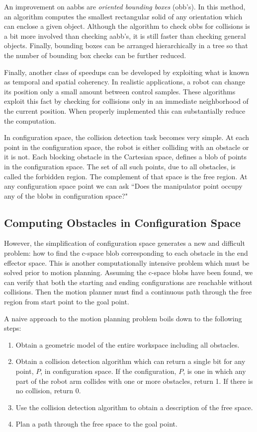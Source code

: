 An improvement on aabbs are \textit{oriented bounding boxes} (obb's).   In this method, an algorithm computes the smallest rectangular solid of any orientation which can enclose a given object.  Although the algorithm to check obbs for collisions is a bit more involved than checking aabb's, it is still   faster than checking general objects.   Finally, bounding boxes can be arranged hierarchically in a tree so that the number of bounding box checks can be further reduced.

Finally, another class of speedups can be developed by exploiting what is known as temporal and spatial coherency.   In realistic applications, a robot can change its position only a small amount between control samples.   These algorithms exploit this fact by checking for collisions only in an immediate neighborhood of the current position.  When properly implemented this can substantially reduce the computation.

In configuration space, the collision detection task becomes very simple. At each point in the configuration space, the robot is either colliding with an obstacle or it is not.   Each blocking obstacle in the Cartesian space, defines a blob of points in the configuration space.  The set of all such points, due to all obstacles, is called the forbidden region.  The complement of that space is the free region.  At any configuration space  point we can ask ``Does the manipulator point occupy any of the blobs in configuration space?"

\subsection{Computing Obstacles in Configuration Space}

However, the simplification of configuration space generates a new and difficult problem: how to find the c-space blob corresponding to each obstacle in the end effector space.  This is another computationally intensive problem which must be solved prior to motion planning.   Assuming the c-space blobs have been found, we can verify that both the starting and ending configurations are reachable without collisions.   Then the motion planner must find a continuous path through the free region from start point to the goal point.

A naive approach to  the motion planning problem boils down to the following steps:
\begin{enumerate}
 \item Obtain a geometric model of the entire workspace including all obstacles. 
 \item Obtain a collision detection algorithm which can return a single bit for any point, $P$, in configuration space.  If the configuration, $P$, is one in which any part of the robot arm collides  with one or more obstacles, return 1.  If there is no collision, return 0.
 \item Use the collision detection algorithm to obtain a description of the free space. 
 \item Plan a path through the free space to the goal point. 
\end{enumerate}

